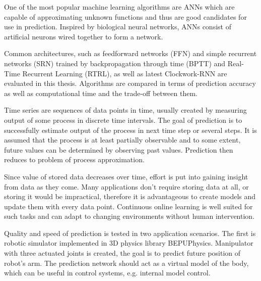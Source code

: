 \documentclass[12pt,oneside]{fithesis2}
\begin{document}
\par %
One of the most popular machine learning algorithms are ANNs which are capable of approximating unknown functions and thus are good candidates for use in prediction. Inspired by biological neural networks, ANNs consist of artificial neurons wired together to form a network.
\par %
Common architectures, such as feedforward networks (FFN) and simple recurrent networks (SRN) trained by backpropagation through time (BPTT) and Real-Time Recurrent Learning (RTRL), as well as latest Clockwork-RNN are evaluated in this thesis. Algorithms are compared in terms of prediction accuracy as well as computational time and the trade-off between them.
\par %
Time series are sequences of data points in time, usually created by measuring output of some process in discrete time intervals. The goal of prediction is to successfully estimate output of the process in next time step or several steps. It is assumed that the process is at least partially observable and to some extent, future values can be determined by observing past values. Prediction then reduces to problem of process approximation.
\par %
Since value of stored data decreases over time, effort is put into gaining insight from data as they come. Many applications don't require storing data at all, or storing it would be impractical, therefore it is advantageous to create models and update them with every data point. Continuous online learning is well suited for such tasks and can adapt to changing environments without human intervention.
\par %
Quality and speed of prediction is tested in two application scenarios. The first is robotic simulator implemented in 3D physics library BEPUPhysics. Manipulator with three actuated joints is created, the goal is to predict future position of robot's arm. The prediction network should act as a virtual model of the body, which can be useful in control systems, e.g. internal model control.

\end{document}
